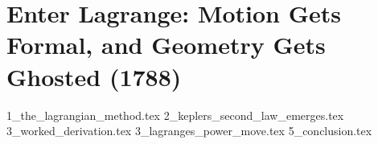 \section{Enter Lagrange: Motion Gets Formal, and Geometry Gets Ghosted (1788)}


{1_the_lagrangian_method.tex}
{2_keplers_second_law_emerges.tex}
{3_worked_derivation.tex}
{3_lagranges_power_move.tex}
{5_conclusion.tex}